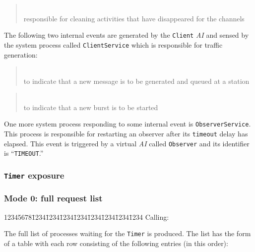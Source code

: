 \begin{quote}
\noindent{}\\ \hspace{0in}
responsible for cleaning activities that have disappeared for the channels
\end{quote}

The following two internal events are generated by the {\tt Client}
{\em AI\/} and sensed by the system process called {\tt ClientService} which is
responsible for traffic generation:

\medskip

\begin{quote}
\noindent{}\\ \hspace{0in}
to indicate that a new message is to be generated and queued at a station
\end{quote}

\begin{quote}
\noindent{}\\ \hspace{0in}
to indicate that a new burst is to be started
\end{quote}\medskip

One more system process responding to some internal event is
{\tt ObserverService}.
This process is responsible for restarting an observer after its
{\tt timeout} delay has elapsed.
This event is triggered by a virtual {\em AI\/} called {\tt Observer} and
its identifier is ``{\tt TIMEOUT}.''

\subsubsection{{\tt Timer} exposure}
\label{rm_ex_se_ti}
\noindent
\subsubsection*{Mode 0: full request list}
{\tt\begin{tabbing}
12345678\=1234\=1234\=1234\=1234\=1234\=1234\=1234\=1234\kill
{\rm Calling:}
\end{tabbing}}

The full list of processes waiting for the {\tt Timer} is produced.
The list has the form of a table with each row consisting of the
following entries (in this order):

